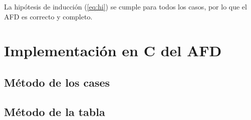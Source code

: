 \documentclass[a4paper]{article}
\begin{document}
  		La hipótesis de inducción (\ref{eq:hi}) se cumple para todos los casos, por lo que el AFD es correcto y completo.

  		\section{Implementación en C del AFD}
  		\subsection{Método de los cases}
  		
  		\subsection{Método de la tabla}
  		
  		
\end{document}
